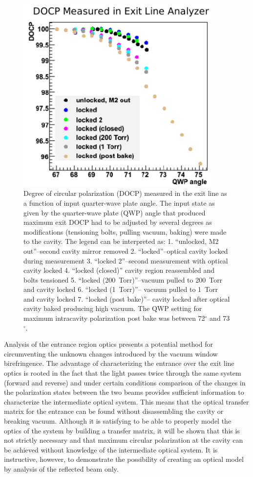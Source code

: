 \begin{figure}[ht]
\centering
\includegraphics[width=4in]{./Pictures/ChangingTF.png}
\caption{\label{fig:TF_change}Degree of circular polarization (DOCP) measured in the exit line as a function of input quarter-wave plate angle. The input state as given by the quarter-wave plate (QWP) angle that produced maximum exit DOCP had to be adjusted by several degrees as modifications (tensioning bolts, pulling vacuum, baking) were made to the cavity. The legend can be interpreted as: 1. ``unlocked, M2 out''--second cavity mirror removed 2. ``locked''--optical cavity locked during measurement 3. ``locked 2''--second measurement with optical cavity locked 4. ``locked (closed)'' cavity region reassembled and bolts tensioned 5. ``locked (200~Torr)''--vacuum pulled to 200~Torr and cavity locked 6. ``locked (1~Torr)''-- vacuum pulled to 1~Torr and cavity locked 7. ``locked (post bake)''-- cavity locked after optical cavity baked producing high vacuum. The QWP setting for maximum intracavity polarization post bake was between 72$^{\circ}$ and 73$^{\circ}$.}
\end{figure}
 
Analysis of the entrance region optics presents a potential method for circumventing the unknown changes introduced by the vacuum window birefringence. The advantage of characterizing the entrance over the exit line optics is rooted in the fact that the light passes twice through the same system (forward and reverse) and under certain conditions comparison of the changes in the polarization states between the two beams provides sufficient information to characterize the intermediate optical system. This means that the optical transfer matrix for the entrance can be found without disassembling the cavity or breaking vacuum. Although it is satisfying to be able to properly model the optics of the system by building a transfer matrix, it will be shown that this is not strictly necessary and that maximum circular polarization at the cavity can be achieved without knowledge of the intermediate optical system. It is instructive, however, to demonstrate the possibility of creating an optical model by analysis of the reflected beam only.

